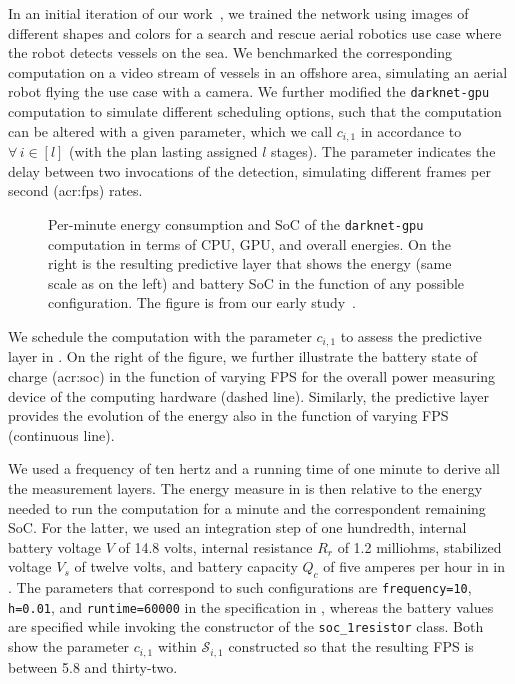In an initial iteration of our work~\citep{teamplayd43}, we trained the network using images of different shapes and colors for a search and rescue aerial robotics use case where the robot detects vessels on the sea. We benchmarked the corresponding computation on a video stream of vessels in an offshore area, simulating an aerial robot flying the use case with a camera. We further modified the {\small\tt darknet-gpu} computation to simulate different scheduling options, such that the computation can be altered with a given parameter, which we call $c_{i,1}$ in accordance to  $\forall\,i\in[l]$  (with the plan lasting assigned $l$ stages). The parameter indicates the delay between two invocations of the detection, simulating different frames per second (\Gls{acr:fps}) rates. 
\begin{figure}[t!]
  \centering
  \selectfont
  
  \caption[Per-minute energy consumption and SoC of the YOLO DNN library detection computation]{Per-minute energy consumption and SoC of the {\tt darknet-gpu} computation in terms of CPU, GPU, and overall energies. On the right is the resulting predictive layer that shows the energy (same scale as on the left) and battery SoC in the function of any possible configuration. The figure is from our early study~\citep{seewald2019coarse}.}
  \label{fig:darknet-layer2}
\end{figure}
We schedule the computation with the parameter $c_{i,1}$ to assess the predictive layer in . On the right of the figure, we further illustrate the battery state of charge (\Gls{acr:soc}) in the function of varying FPS for the overall power measuring device of the computing hardware (dashed line). Similarly, the predictive layer provides the evolution of the energy also in the function of varying FPS (continuous line).

We used a frequency of ten hertz and a running time of one minute to derive all the measurement layers. The energy measure in  is then relative to the energy needed to run the computation for a minute and the correspondent remaining SoC. For the latter, we used an integration step of one hundredth, internal battery voltage $V$ of 14.8 volts, internal resistance $R_r$ of 1.2 milliohms, stabilized voltage $V_s$ of twelve volts, and battery capacity $Q_c$ of five amperes per hour in  in . The parameters that correspond to such configurations are {\small\tt frequency=10}, {\small\tt h=0.01}, and {\small\tt runtime=60000} in the specification in , whereas the battery values are specified while invoking the constructor of the {\small\tt soc\_1resistor} class. Both  show the parameter $c_{i,1}$ within $\mathcal{S}_{i,1}$ constructed so that the resulting FPS is between 5.8 and thirty-two.

